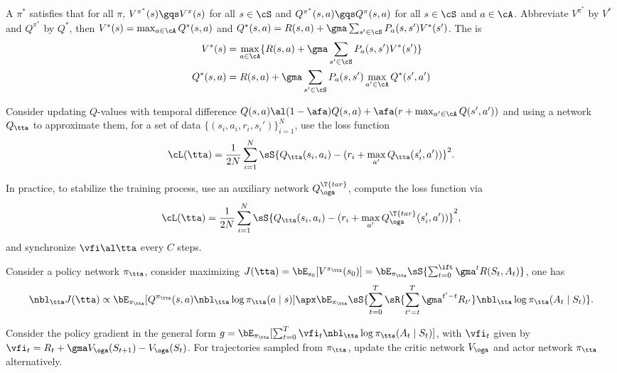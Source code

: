 \documentclass[article, a4paper, twoside]{universal}
\begin{document}
\begin{dfn}
    A  $\pi^{*}$ satisfies that for all $\pi$, $V^{\pi^{*}}(s)\gqs V^{\pi}(s)$ for all $s\in\cS$ and $Q^{\pi^{*}}(s,a)\gqs Q^{\pi}(s,a)$ for all $s\in\cS$ and $a\in\cA$. Abbreviate $V^{\pi^{*}}$ by $V^{*}$ and $Q^{\pi^{*}}$ by $Q^{*}$, then $V^{*}(s)=\max_{a\in\cA}Q^{*}(s,a)$ and $Q^{*}(s,a)=R(s,a)+\gma\sum_{s'\in\cS}P_{a}(s,s')V^{*}(s')$. The  is
    \begin{align*}
      V^{*}(s)&=\max_{a\in\cA}\{R(s,a)+\gma\sum_{s'\in\cS}P_{a}(s,s')V^{*}(s')\} \\
      Q^{*}(s,a)&=R(s,a)+\gma\sum_{s'\in\cS}P_{a}(s,s')\max_{a'\in\cA}Q^{*}(s',a')
    \end{align*}    
\end{dfn}




Consider updating $Q$-values with temporal difference $Q(s,a)\al(1-\afa)Q(s,a)+\afa(r+\max_{a'\in\cA}Q(s',a'))$ and using a network $Q_{\tta}$ to approximate them, for a set of data $\{(s_{i},a_{i},r_{i},s_{i}')\}_{i=1}^{N}$, use the loss function
\[
    \cL(\tta)=\frac{1}{2N}\sum_{i=1}^{N}\sS{Q_{\tta}(s_{i},a_{i})-(r_{i}+\max_{a'}Q_{\tta}(s_{i}',a'))}^{2}.
\]

In practice, to stabilize the training process, use an auxiliary network $Q_{\oga}^{\T{tar}}$, compute the loss function via
\[
    \cL(\tta)=\frac{1}{2N}\sum_{i=1}^{N}\sS{Q_{\tta}(s_{i},a_{i})-(r_{i}+\max_{a'}Q_{\oga}^{\T{tar}}(s_{i}',a'))}^{2},
\]
and synchronize $\vfi\al\tta$ every $C$ steps.




Consider a policy network $\pi_{\tta}$, consider maximizing $J(\tta)=\bE_{s_{0}}[V^{\pi_{\tta}}(s_{0})]=\bE_{\pi_{\tta}}\sS{\sum_{t=0}^{\ift}\gma^{t}R(S_{t},A_{t})}$, one has
\[
    \nbl_{\tta}J(\tta)\propto\bE_{\pi_{\tta}}[Q^{\pi_{\tta}}(s,a)\nbl_{\tta}\log\pi_{\tta}(a\mid s)]\apx\bE_{\pi_{\tta}}\sS{\sum_{t=0}^{T}\sR{\sum_{t'=t}^{T}\gma^{t'-t}R_{t'}}\nbl_{\tta}\log\pi_{\tta}(A_{t}\mid S_{t})}.
\]



Consider the policy gradient in the general form $g=\bE_{\pi_{\tta}}[\sum_{t=0}^{T}\vfi_{t}\nbl_{\tta}\log\pi_{\tta}(A_{t}\mid S_{t})]$, with $\vfi_{t}$ given by $\vfi_{t}=R_{t}+\gma V_{\oga}(S_{t+1})-V_{\oga}(S_{t})$. For trajectories sampled from $\pi_{\tta}$, update the critic network $V_{\oga}$ and actor network $\pi_{\tta}$ alternatively.
\end{document}
